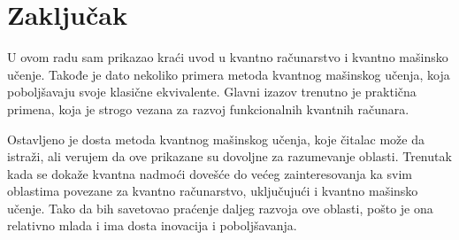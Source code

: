 \documentclass[12pt, letterpaper, oneside]{article}
\begin{document}
\section{Zaključak}
U ovom radu sam prikazao kraći uvod u kvantno računarstvo i kvantno mašinsko učenje. Takođe je dato nekoliko primera metoda kvantnog mašinskog učenja, 
koja poboljšavaju svoje klasične ekvivalente. Glavni izazov trenutno je praktična primena, koja je strogo vezana za razvoj funkcionalnih kvantnih računara.

Ostavljeno je dosta metoda kvantnog mašinskog učenja, koje čitalac može da istraži, ali verujem da ove prikazane su dovoljne za razumevanje oblasti.
Trenutak kada se dokaže kvantna nadmoći dovešće do većeg zainteresovanja ka svim oblastima povezane za kvantno računarstvo, 
uključujući i kvantno mašinsko učenje. Tako da bih savetovao praćenje daljeg razvoja ove oblasti, pošto je ona relativno mlada
i ima dosta inovacija i poboljšavanja.


\newpage

\printbibliography
\end{document}
